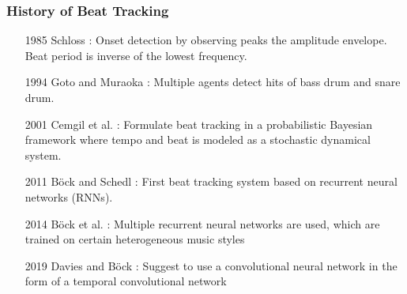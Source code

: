 \documentclass{beamer}
\newcommand{\backupend}{
   \setcounter{framenumber}{\value{finalframe}}
}
\begin{document}
\begin{frame}
\frametitle{History of Beat Tracking}
\begin{itemize}
\item[1985] Schloss \cite{Schloss1985}: Onset detection by observing peaks the amplitude envelope. Beat period is inverse of the lowest frequency.
\item[1994] Goto and Muraoka \cite{Goto1994}: Multiple agents detect hits of bass drum and snare drum.
\item[2001] Cemgil et al. \cite{Cemgil2001}: Formulate beat tracking in a probabilistic Bayesian framework where tempo and beat is modeled as a stochastic dynamical system.
\item[2011] Böck and Schedl \cite{Boeck2011}: First beat tracking system based on recurrent neural networks (RNNs).
\item[2014] Böck et al. \cite{Boeck2014}: Multiple recurrent neural networks are used, which are trained on certain heterogeneous music styles
\item[2019] Davies and Böck \cite{Davies2019}: Suggest to use a convolutional neural network in the form of a temporal convolutional network 
\end{itemize}
\end{frame}

\backupend
\end{document}
